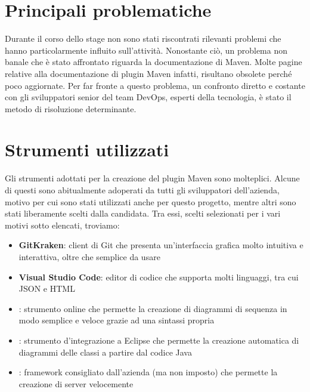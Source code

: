 \section{Principali problematiche}
Durante il corso dello stage non sono stati riscontrati rilevanti problemi che hanno particolarmente influito sull'attività.
Nonostante ciò, un problema non banale che è stato affrontato riguarda la documentazione di Maven.
Molte pagine relative alla documentazione di plugin Maven infatti, risultano obsolete perché poco aggiornate.
Per far fronte a questo problema, un confronto diretto e costante con gli sviluppatori senior del team DevOps, esperti della tecnologia, è stato il metodo di risoluzione determinante.


\section{Strumenti utilizzati}
Gli strumenti adottati per la creazione del plugin Maven sono molteplici.
Alcune di questi sono abitualmente adoperati da tutti gli sviluppatori dell'azienda, motivo per cui sono stati utilizzati anche per questo progetto, mentre altri sono stati liberamente scelti dalla candidata.
Tra essi, scelti selezionati per i vari motivi sotto elencati, troviamo:
\begin{itemize}
    \item \textbf{GitKraken}: client di Git che presenta un'interfaccia grafica molto intuitiva e interattiva, oltre che semplice da usare
    \item \textbf{Visual Studio Code}: editor di codice che supporta molti linguaggi, tra cui JSON e HTML
    \item {}: strumento online che permette la creazione di diagrammi di sequenza in modo semplice e veloce grazie ad una sintassi propria
    \item {}: strumento d'integrazione a Eclipse che permette la creazione automatica di diagrammi delle classi a partire dal codice Java
    \item {}: framework consigliato dall'azienda (ma non imposto) che permette la creazione di server velocemente
\end{itemize}

